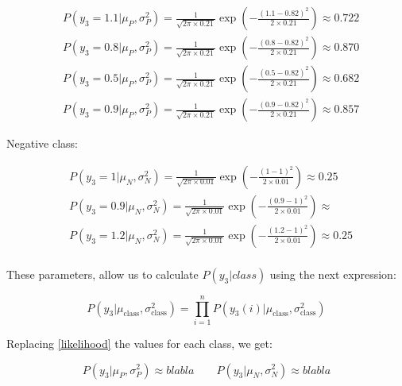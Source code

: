\documentclass[12pt]{article}
\begin{document}
\begin{enumerate}[leftmargin=\labelsep]
    \begin{equation*}
        \begin{aligned}
            &P(y_3 = 1.1|\mu_P, \sigma_P^2) = \frac{1}{\sqrt{2\pi \times 0.21}} \exp\left(-\frac{(1.1 - 0.82)^2}{2 \times 0.21}\right) \approx 0.722\\
            &P(y_3 = 0.8|\mu_P, \sigma_P^2) = \frac{1}{\sqrt{2\pi \times 0.21}} \exp\left(-\frac{(0.8 - 0.82)^2}{2 \times 0.21}\right) \approx 0.870\\
            &P(y_3 = 0.5|\mu_P, \sigma_P^2) = \frac{1}{\sqrt{2\pi \times 0.21}} \exp\left(-\frac{(0.5 - 0.82)^2}{2 \times 0.21}\right) \approx 0.682\\
            &P(y_3 = 0.9|\mu_P, \sigma_P^2) = \frac{1}{\sqrt{2\pi \times 0.21}} \exp\left(-\frac{(0.9 - 0.82)^2}{2 \times 0.21}\right) \approx 0.857
        \end{aligned}
    \end{equation*}


    \vspace{10pt}
    Negative class:
    
    \begin{equation*}
        \begin{aligned}
            &P(y_3 = 1|\mu_N, \sigma_N^2) = \frac{1}{\sqrt{2\pi \times 0.01}} \exp\left(-\frac{(1 - 1)^2}{2 \times 0.01}\right) \approx 0.25\\
            &P(y_3 = 0.9|\mu_N, \sigma_N^2) = \frac{1}{\sqrt{2\pi \times 0.01}} \exp\left(-\frac{(0.9 - 1)^2}{2 \times 0.01}\right) \approx \\
            &P(y_3 = 1.2|\mu_N, \sigma_N^2) = \frac{1}{\sqrt{2\pi \times 0.01}} \exp\left(-\frac{(1.2 - 1)^2}{2 \times 0.01}\right) \approx 0.25\\
        \end{aligned}
    \end{equation*}

    \vspace{10pt}
    These parameters, allow us to calculate $P(y_3|class)$ using the next expression:

    \begin{equation*}\label{likelihood}
        P(y_3 | \mu_\text{class}, \sigma_\text{class}^2) = \prod_{i=1}^{n} P(y_3(i) | \mu_\text{class}, \sigma_\text{class}^2)
    \end{equation*}

    Replacing \eqref{likelihood} the values for each class, we get:

    
    \begin{equation*}
        P(y_3 | \mu_P, \sigma_P^2) \approx bla bla \quad \quad P(y_3 | \mu_N, \sigma_N^2) \approx bla bla
    \end{equation*}



\end{enumerate}
\end{document}
